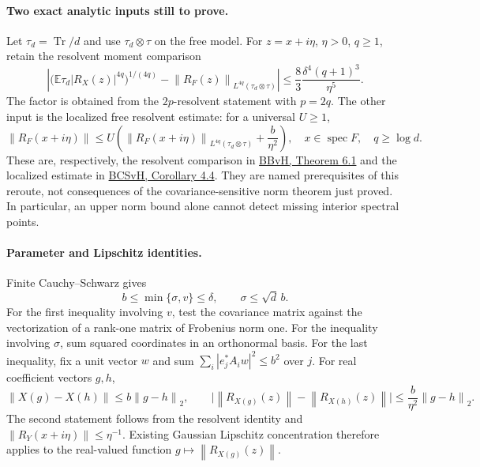\documentclass[11pt,a4paper]{article}
\newcommand{\norm}[1]{\left\lVert#1\right\rVert}
\begin{document}
\paragraph{Two exact analytic inputs still to prove.}
Let \(\tau_d=\operatorname{Tr}/d\) and use \(\tau_d\otimes\tau\) on the free
model.  For \(z=x+i\eta\), \(\eta>0\), \(q\geq1\), retain the resolvent
moment comparison
\begin{equation}
 \left|
 \bigl(\mathbb E\tau_d|R_X(z)|^{4q}\bigr)^{1/(4q)}
 -\norm{R_F(z)}_{L^{4q}(\tau_d\otimes\tau)}
 \right|
 \leq\frac83\frac{\delta^4(q+1)^3}{\eta^5}.
 \tag{RM}\label{eq:free-rm}
\end{equation}
The factor is obtained from the \(2p\)-resolvent statement with \(p=2q\).
The other input is the localized free resolvent estimate: for a universal
\(U\geq1\),
\begin{equation}
 \norm{R_F(x+i\eta)}
 \leq U\left(
 \norm{R_F(x+i\eta)}_{L^{4q}(\tau_d\otimes\tau)}
 +\frac b{\eta^2}\right),
 \quad x\in\operatorname{spec}F,\quad q\geq\log d.
 \tag{LU}\label{eq:free-lu}
\end{equation}
These are, respectively, the resolvent comparison in
\href{https://arxiv.org/abs/2108.06312v2}{BBvH, Theorem 6.1} and the
localized estimate in
\href{https://arxiv.org/abs/2406.11453v2}{BCSvH, Corollary 4.4}.
They are named prerequisites of this reroute, not consequences of the
covariance-sensitive norm theorem just proved.  In particular, an upper
norm bound alone cannot detect missing interior spectral points.

\paragraph{Parameter and Lipschitz identities.}
Finite Cauchy--Schwarz gives
\begin{equation}
 b\leq\min\{\sigma,v\}\leq\delta,
 \qquad \sigma\leq\sqrt d\,b.
 \label{eq:free-parameters}
\end{equation}
For the first inequality involving \(v\), test the covariance matrix against
the vectorization of a rank-one matrix of Frobenius norm one.  For the
inequality involving \(\sigma\), sum squared coordinates in an orthonormal
basis.  For the last inequality, fix a unit vector \(w\) and sum
\(\sum_i|e_j^*A_iw|^2\leq b^2\) over \(j\).
For real coefficient vectors \(g,h\),
\[
 \norm{X(g)-X(h)}\leq b\norm{g-h}_2,
 \qquad
 \bigl|\norm{R_{X(g)}(z)}-\norm{R_{X(h)}(z)}\bigr|
 \leq\frac b{\eta^2}\norm{g-h}_2.
\]
The second statement follows from the resolvent identity and
\(\norm{R_Y(x+i\eta)}\leq\eta^{-1}\).  Existing Gaussian Lipschitz
concentration therefore applies to the real-valued function
\(g\mapsto\norm{R_{X(g)}(z)}\).
\end{document}
